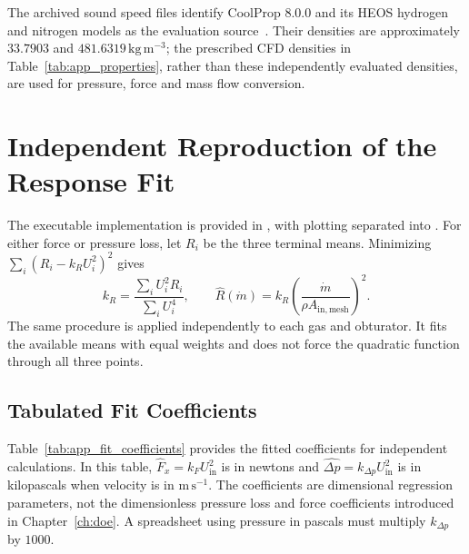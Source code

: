 The archived sound speed files identify CoolProp 8.0.0 and its HEOS hydrogen and nitrogen models as the evaluation source~\cite{coolprop2014,leachman2009,span2000}. Their densities are approximately $33.7903$ and $481.6319\,\mathrm{kg\,m^{-3}}$; the prescribed CFD densities in Table~\ref{tab:app_properties}, rather than these independently evaluated densities, are used for pressure, force and mass flow conversion.

\clearpage
\section[Reproducing the Response Fit]{Independent Reproduction of the Response Fit}
\label{sec:app_plotly_script}

The executable implementation is provided in , with plotting separated into . For either force or pressure loss, let $R_i$ be the three terminal means. Minimizing $\sum_i(R_i-k_RU_i^2)^2$ gives
\[
k_R=\frac{\sum_i U_i^2R_i}{\sum_i U_i^4},\qquad
\widehat R(\dot m)=k_R\left(\frac{\dot m}{\rho A_{\mathrm{in,mesh}}}\right)^2.
\]
The same procedure is applied independently to each gas and obturator. It fits the available means with equal weights and does not force the quadratic function through all three points.

\subsection{Tabulated Fit Coefficients}
\label{sec:app_fit_coefficients}

Table~\ref{tab:app_fit_coefficients} provides the fitted coefficients for independent calculations. In this table, $\widehat F_x=k_F U_{\mathrm{in}}^2$ is in newtons and $\widehat{\Delta p}=k_{\Delta p} U_{\mathrm{in}}^2$ is in kilopascals when velocity is in $\mathrm{m\,s^{-1}}$. The coefficients are dimensional regression parameters, not the dimensionless pressure loss and force coefficients introduced in Chapter~\ref{ch:doe}. A spreadsheet using pressure in pascals must multiply $k_{\Delta p}$ by $1000$.


